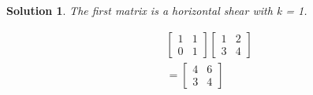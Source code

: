 \documentclass{article}
\newtheorem*{solution}{Solution}
\begin{document}
\begin{solution}
The first matrix is a horizontal shear with k = 1.

\begin{align*}
& \begin{bmatrix}
1 & 1 \\ 0 & 1
\end{bmatrix}
\begin{bmatrix}
1 & 2 \\ 3 & 4
\end{bmatrix} \\
&= 
\begin{bmatrix}
4 & 6 \\ 3 & 4
\end{bmatrix} 
\end{align*}
\end{solution}
\end{document}
